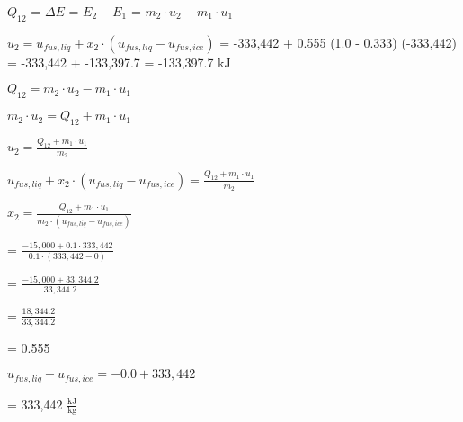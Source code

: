 \( Q_{12} \) = \( \Delta E \)  
= \( E_2 - E_1 \)  
= \( m_2 \cdot u_2 - m_1 \cdot u_1 \)  

\( u_2 = u_{fus,liq} + x_2 \cdot (u_{fus,liq} - u_{fus,ice}) \)  
= -333,442 + 0.555 \cdot (1.0 - 0.333) \cdot (-333,442)  
= -333,442 + -133,397.7  
= -133,397.7 kJ  

\( Q_{12} = m_2 \cdot u_2 - m_1 \cdot u_1 \)  

\( m_2 \cdot u_2 = Q_{12} + m_1 \cdot u_1 \)  

\( u_2 = \frac{Q_{12} + m_1 \cdot u_1}{m_2} \)  

\( u_{fus,liq} + x_2 \cdot (u_{fus,liq} - u_{fus,ice}) = \frac{Q_{12} + m_1 \cdot u_1}{m_2} \)  

\( x_2 = \frac{Q_{12} + m_1 \cdot u_1}{m_2 \cdot (u_{fus,liq} - u_{fus,ice})} \)  

= \( \frac{-15,000 + 0.1 \cdot 333,442}{0.1 \cdot (333,442 - 0)} \)  

= \( \frac{-15,000 + 33,344.2}{33,344.2} \)  

= \( \frac{18,344.2}{33,344.2} \)  

= 0.555  

\( u_{fus,liq} - u_{fus,ice} = -0.0 + 333,442 \)  

= 333,442 \( \frac{\text{kJ}}{\text{kg}} \)